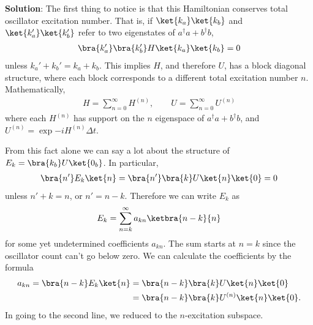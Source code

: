 \documentclass{book}
\begin{document}
    \textbf{Solution}: The first thing to notice is that this Hamiltonian conserves total oscillator excitation number. That is, if $\ket{k_a}\ket{k_b}$ and $\ket{k_a'}\ket{k_b'}$ refer to two eigenstates of $a^\dagger a + b^\dagger b$,
    \begin{align}
        \bra{k_a'}\bra{k_b'}H \ket{k_a}\ket{k_b} = 0
    \end{align}
    unless $k_a' + k_b' = k_a + k_b$. This implies $H$, and therefore $U$, has a block diagonal structure, where each block corresponds to a different total excitation number $n$. Mathematically, 
    \begin{align}
        H = \sum_{n=0}^\infty H^{(n)}, \qquad U = \sum_{n=0}^\infty U^{(n)} 
    \end{align}
    where each $H^{(n)}$ has support on the $n$ eigenspace of $a^\dagger a + b^\dagger b$, and $U^{(n)} = \exp{-i H^{(n)} \Delta t}$.
    
    From this fact alone we can say a lot about the structure of $E_k  = \bra{k_b}U\ket{0_b}$. In particular,
    \begin{align}
        \bra{n'}E_k \ket{n} = \bra{n'}\bra{k} U\ket{n}\ket{0} = 0
    \end{align}
    unless $n ' + k = n$, or $n' = n-k$. Therefore we can write $E_k$ as 
    \begin{align}
        E_k = \sum_{n=k}^\infty a_{kn} \ketbra{n-k}{n}
    \end{align}
    for some yet undetermined coefficients $a_{kn}$. The sum starts at $n = k$ since the oscillator count can't go below zero. We can calculate the coefficients by the formula
    \begin{align}
    \begin{aligned}
        a_{kn} = \bra{n-k} E_k \ket{n} &= \bra{n-k}\bra{k} U \ket{n}\ket{0} \\
        &= \bra{n-k}\bra{k} U^{(n)} \ket{n}\ket{0}.
    \end{aligned}
    \end{align}
    In going to the second line, we reduced to the $n$-excitation subspace. 
    
\end{document}
